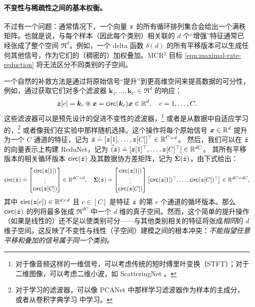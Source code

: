 \documentclass[../../book-main.tex]{subfiles}
\begin{document}
\paragraph{不变性与稀疏性之间的基本权衡。}
不过有一个问题：通常情况下，一个向量 $\bm{z}$ 的所有循环排列集合会给出一个满秩矩阵。也就是说，与每个样本（因此每个类别）相关联的 $d$ 个“增强”特征通常已经张成了整个空间 $\Re^d$。例如，一个 delta 函数 $\delta(d)$ 的所有平移版本可以生成任何其他信号，作为它们的（稠密的）加权叠加。MCR$^2$ 目标 \eqref{eqn:maximal-rate-reduction} 将无法区分不同类别的子空间。

一个自然的补救方法是通过将原始信号“提升”到更高维空间来提高数据的可分性，例如，通过获取它们对多个滤波器 $\bm k_1, \ldots, \bm k_C \in \Re^d$ 的响应：
\begin{equation}
\bm z[c] = \bm k_c \circledast \bm x  =  \mathsf{circ}(\bm k_c) \bm x \in \mathbb{R}^d, \quad c = 1, \ldots, C.
\label{eqn:lift-1d}
\end{equation}
这些滤波器可以是预先设计的促进不变性的滤波器，\footnote{对于像音频这样的一维信号，可以考虑传统的短时傅里叶变换（STFT）；对于二维图像，可以考虑二维小波，如 ScatteringNet \cite{scattering-net}。} 或者是从数据中自适应学习的，\footnote{对于学习的滤波器，可以像 PCANet \cite{chan2015pcanet} 中那样学习滤波器作为样本的主成分，或者从卷积字典学习 \cite{li2019multichannel,qu2019nonconvex} 中学习。} 或者像我们在实验中那样随机选择。这个操作将每个原始信号 $\bm{x} \in \mathbb{R}^d$ 提升为一个 $C$ 通道的特征，记为 $\bar{\bm{z}}  \doteq [\bm{z}[1], \ldots, \bm{z}[C]]^\top \in \mathbb{R}^{C\times d}$。
然后，我们可以在 $\bar{\bm{z}}$ 的向量表示上构建 ReduNet，记为
$\vec(\bar{\bm{z}}) \doteq [\bm{z}[1]^\top, \ldots, \bm{z}[C]^\top] \in \mathbb{R}^{dC}$。
其所有平移版本的相关循环版本 $ \mathsf{circ}(\bar{\bm{z}})$ 及其数据协方差矩阵，记为 $\bar{\bm \Sigma}(\bar{\bm{z}})$，由下式给出：
\begin{equation}
\begin{aligned}
 \mathsf{circ}(\bar{\bm{z}}) \doteq \left[\begin{matrix}
    \mathsf{circ}(\bm{z}[1])  \\ \vdots \\ \mathsf{circ}(\bm{z}[C]) \end{matrix} \right] \in \mathbb{R}^{dC\times d},
    \quad  \bar{\bm \Sigma}(\bar{\bm{z}}) \doteq
    \left[\begin{matrix}
    \mathsf{circ}(\bm{z}[1]) \\ \vdots \\ \mathsf{circ}(\bm{z}[C]) \end{matrix} \right]
    \left[\begin{matrix}\mathsf{circ}(\bm{z}[1])^\top,\ldots, \mathsf{circ}(\bm{z}[C])^\top\end{matrix} \right] \in \mathbb{R}^{dC\times dC},
    \label{eqn:W-multichannel}
\end{aligned}
\end{equation}
其中 $\mathsf{circ}(\bm{z}[c]) \in \mathbb{R}^{d\times d}$ 且 $c \in [C]$ 是特征 $\bar {\bm{z}}$ 的第 $c$ 个通道的循环版本。那么 $\mathsf{circ}(\bar{\bm{z}})$ 的列将最多张成 $\Re^{dC}$ 中一个 $d$ 维的真子空间。然而，这个简单的提升操作（如果是线性的）还不足以使类别可分——与其他类别相关的特征将张成{\em 相同}的 $d$ 维子空间。这反映了不变性与线性（子空间）建模之间的根本冲突：{\em 不能指望任意平移和叠加的信号属于同一个类别。}
\end{document}

